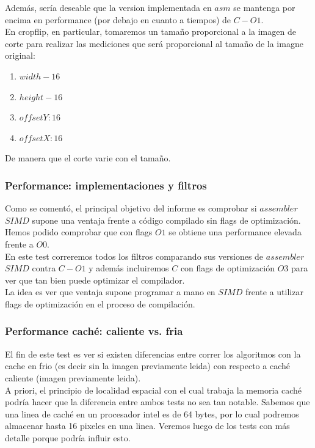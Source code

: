 Además, sería deseable que la version implementada en $asm$ se mantenga por encima en performance (por debajo en cuanto a tiempos) de $C-O1$. \\ 
En cropflip, en particular, tomaremos un tamaño proporcional a la imagen de corte para realizar las mediciones que será proporcional al tamaño de la imagne original: \\

\begin{enumerate}
\item $width-16$ 
\item $height-16$
\item $offsetY: 16$
\item $offsetX: 16$
\end{enumerate}

De manera que el corte varie con el tamaño. 

\subsubsection{Performance: implementaciones y filtros}

Como se comentó, el principal objetivo del informe es comprobar si $assembler$ $SIMD$ supone una ventaja frente a código compilado sin flags de optimización. 
Hemos podido comprobar que con flags $O1$ se obtiene una performance elevada frente a $O0$.\\

En este test correremos todos los filtros comparando sus versiones de $assembler$ $SIMD$ contra $C-O1$ y además incluiremos $C$ con flags de optimización $O3$ para ver que tan bien puede optimizar el compilador. \\
La idea es ver que ventaja supone programar a mano en $SIMD$ frente a utilizar flags de optimización en el proceso de compilación.\\ 

\subsubsection{Performance caché: caliente vs. fria}

El fin de este test es ver si existen diferencias entre correr los algoritmos con la cache en frio (es decir sin la imagen previamente leida) con respecto a caché caliente (imagen previamente leida). \\

A priori, el principio de localidad espacial con el cual trabaja la memoria caché podría hacer que la diferencia entre ambos tests no sea tan notable. 
Sabemos que una linea de caché en un procesador intel es de 64 bytes, por lo cual podremos almacenar hasta 16 pixeles en una linea. Veremos luego de los tests con más detalle porque podría influir esto.

